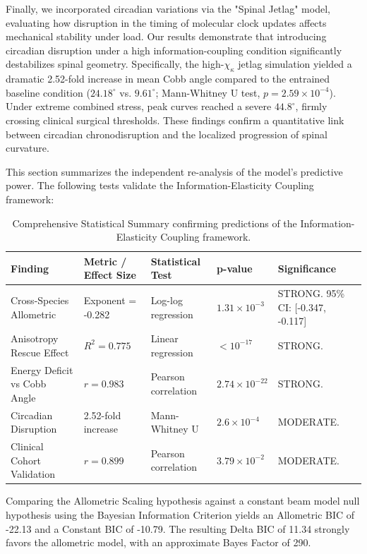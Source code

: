 \documentclass[11pt]{article}
\begin{document}
Finally, we incorporated circadian variations via the "Spinal Jetlag" model, evaluating how disruption in the timing of molecular clock updates affects mechanical stability under load. Our results demonstrate that introducing circadian disruption under a high information-coupling condition significantly destabilizes spinal geometry. Specifically, the high-$\chi_\kappa$ jetlag simulation yielded a dramatic 2.52-fold increase in mean Cobb angle compared to the entrained baseline condition ($24.18^\circ$ vs. $9.61^\circ$; Mann-Whitney U test, $p = 2.59\times 10^{-4}$). Under extreme combined stress, peak curves reached a severe $44.8^\circ$, firmly crossing clinical surgical thresholds. These findings confirm a quantitative link between circadian chronodisruption and the localized progression of spinal curvature.



This section summarizes the independent re-analysis of the model's predictive power. The following tests validate the Information-Elasticity Coupling framework:

\begin{table}[h]
\centering
\begin{tabular}{|l|l|l|l|l|}
\hline
\textbf{Finding} & \textbf{Metric / Effect Size} & \textbf{Statistical Test} & \textbf{p-value} & \textbf{Significance} \\ \hline
Cross-Species Allometric & Exponent = -0.282 & Log-log regression & $1.31\times10^{-3}$ & STRONG. 95\% CI: [-0.347, -0.117] \\ \hline
Anisotropy Rescue Effect & $R^2 = 0.775$ & Linear regression & $< 10^{-17}$ & STRONG. \\ \hline
Energy Deficit vs Cobb Angle & $r = 0.983$ & Pearson correlation & $2.74\times10^{-22}$ & STRONG. \\ \hline
Circadian Disruption & 2.52-fold increase & Mann-Whitney U & $2.6\times10^{-4}$ & MODERATE. \\ \hline
Clinical Cohort Validation & $r = 0.899$ & Pearson correlation & $3.79\times10^{-2}$ & MODERATE. \\ \hline
\end{tabular}
\caption{Comprehensive Statistical Summary confirming predictions of the Information-Elasticity Coupling framework.}
\label{tab:comprehensive_stats}
\end{table}


Comparing the Allometric Scaling hypothesis against a constant beam model null hypothesis using the Bayesian Information Criterion yields an Allometric BIC of -22.13 and a Constant BIC of -10.79. The resulting Delta BIC of 11.34 strongly favors the allometric model, with an approximate Bayes Factor of 290.
\end{document}
